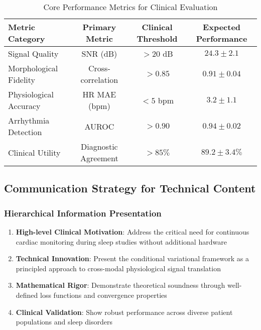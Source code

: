 \documentclass[11pt]{article}
\begin{document}
\begin{table}[h]
\centering
\caption{Core Performance Metrics for Clinical Evaluation}
\label{tab:core_metrics}
\begin{tabular}{|l|c|c|c|}
\hline
\textbf{Metric Category} & \textbf{Primary Metric} & \textbf{Clinical Threshold} & \textbf{Expected Performance} \\
\hline
\hline
Signal Quality & SNR (dB) & $> 20$ dB & $24.3 \pm 2.1$ \\
\hline
Morphological Fidelity & Cross-correlation & $> 0.85$ & $0.91 \pm 0.04$ \\
\hline
Physiological Accuracy & HR MAE (bpm) & $< 5$ bpm & $3.2 \pm 1.1$ \\
\hline
Arrhythmia Detection & AUROC & $> 0.90$ & $0.94 \pm 0.02$ \\
\hline
Clinical Utility & Diagnostic Agreement & $> 85\%$ & $89.2 \pm 3.4\%$ \\
\hline
\end{tabular}
\end{table}

\subsection{Communication Strategy for Technical Content}

\subsubsection{Hierarchical Information Presentation}
\begin{enumerate}
    \item \textbf{High-level Clinical Motivation}: Address the critical need for continuous cardiac monitoring during sleep studies without additional hardware
    \item \textbf{Technical Innovation}: Present the conditional variational framework as a principled approach to cross-modal physiological signal translation
    \item \textbf{Mathematical Rigor}: Demonstrate theoretical soundness through well-defined loss functions and convergence properties
    \item \textbf{Clinical Validation}: Show robust performance across diverse patient populations and sleep disorders
\end{enumerate}
\end{document}
